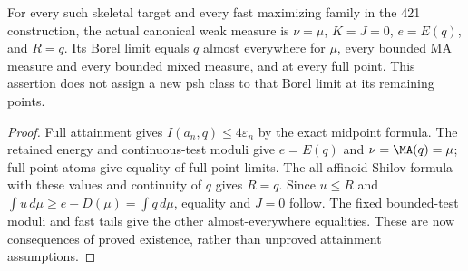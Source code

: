 \begin{corollary}\label{newrad:fast}
For every such skeletal target and every fast maximizing family in the
421 construction, the actual canonical weak measure is $\nu=\mu$,
$K=J=0$, $e=E(q)$, and $R=q$. Its Borel limit equals $q$ almost
everywhere for $\mu$, every bounded MA measure and every bounded mixed
measure, and at every full point. This assertion does not assign a
new psh class to that Borel limit at its remaining points.
\end{corollary}
\begin{proof}
Full attainment gives $I(a_n,q)\le4\varepsilon_n$ by the exact
midpoint formula. The retained energy and continuous-test moduli give
$e=E(q)$ and $\nu=\MA(q)=\mu$; full-point atoms give equality of
full-point limits. The all-affinoid Shilov formula with these values
and continuity of $q$ gives $R=q$. Since $u\le R$ and
$\int u\,d\mu\ge e-D(\mu)=\int q\,d\mu$, equality and $J=0$
follow. The fixed bounded-test moduli and fast tails give the other
almost-everywhere equalities. These are now consequences of proved
existence, rather than unproved attainment assumptions.
\end{proof}

